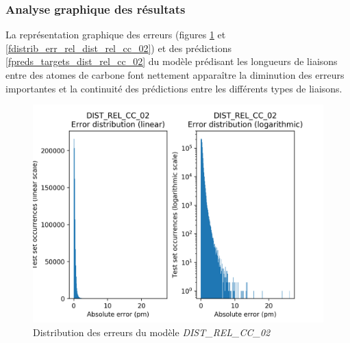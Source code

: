 \subsubsection{Analyse graphique des résultats}

\par La représentation graphique des erreurs (figures \ref{fdistrib_err_dist_rel_cc_02} et \ref{fdistrib_err_rel_dist_rel_cc_02}) et des prédictions \ref{fpreds_targets_dist_rel_cc_02} du modèle prédisant les longueurs de liaisons entre des atomes de carbone font nettement apparaître la diminution des erreurs importantes et la continuité des prédictions entre les différents types de liaisons.


\begin{figure}
	\centering
	
	\includegraphics[scale=0.8]{../figures/DIST_REL_CC_02/DIST_REL_CC_02_distrib_rmse_val.png}	
	
	\caption{Distribution des erreurs du modèle \emph{DIST\_REL\_CC\_02}}
	\label{fdistrib_err_dist_rel_cc_02}
\end{figure}
